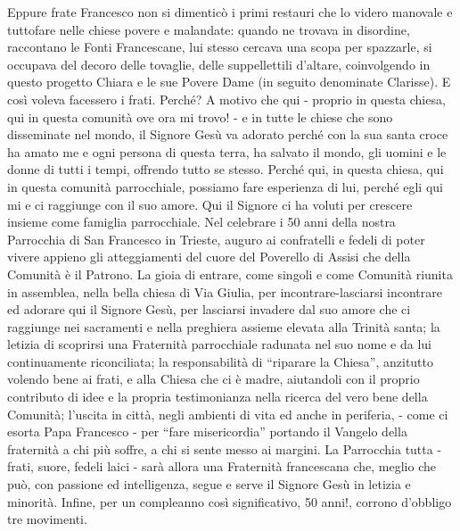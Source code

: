 Eppure frate Francesco non si dimenticò i primi restauri che lo videro manovale e tuttofare 
nelle chiese povere e malandate: quando ne trovava in disordine, raccontano le Fonti Francescane, 
lui stesso cercava una scopa per spazzarle, si occupava del decoro delle tovaglie, delle suppellettili 
d’altare, coinvolgendo in questo progetto Chiara e le sue Povere Dame (in seguito denominate 
Clarisse). E così voleva facessero i frati. Perché? A motivo che qui - proprio in questa chiesa, qui in 
questa comunità ove ora mi trovo! - e in tutte le chiese che sono disseminate nel mondo, il Signore 
Gesù va adorato perché con la sua santa croce ha amato me e ogni persona di questa terra, ha 
salvato il mondo, gli uomini e le donne di tutti i tempi, offrendo tutto se stesso. Perché qui, in 
questa chiesa, qui in questa comunità parrocchiale, possiamo fare esperienza di lui, perché egli qui 
mi e ci raggiunge con il suo amore. Qui il Signore ci ha voluti per crescere insieme come famiglia 
parrocchiale.
\bigbreak
Nel celebrare i 50 anni della nostra Parrocchia di San Francesco in Trieste, auguro ai
confratelli e fedeli di poter vivere appieno gli atteggiamenti del cuore del Poverello di Assisi che 
della Comunità è il Patrono. La gioia di entrare, come singoli e come Comunità riunita in 
assemblea, nella bella chiesa di Via Giulia, per incontrare-lasciarsi incontrare ed adorare qui il 
Signore Gesù, per lasciarsi invadere dal suo amore che ci raggiunge nei sacramenti e nella preghiera 
assieme elevata alla Trinità santa; la letizia di scoprirsi una Fraternità parrocchiale radunata nel suo 
nome e da lui continuamente riconciliata; la responsabilità di “riparare la Chiesa”, anzitutto volendo 
bene ai frati, e alla Chiesa che ci è madre, aiutandoli con il proprio contributo di idee e la propria 
testimonianza nella ricerca del vero bene della Comunità; l’uscita in città, negli ambienti di vita ed 
anche in periferia, - come ci esorta Papa Francesco - per “fare misericordia” portando il Vangelo 
della fraternità a chi più soffre, a chi si sente messo ai margini.
La Parrocchia tutta - frati, suore, fedeli laici - sarà allora una Fraternità francescana che, meglio che 
può, con passione ed intelligenza,  segue e serve il Signore Gesù in letizia e minorità.
\bigbreak
Infine, per un compleanno così significativo, 50 anni!, corrono d’obbligo tre movimenti.
